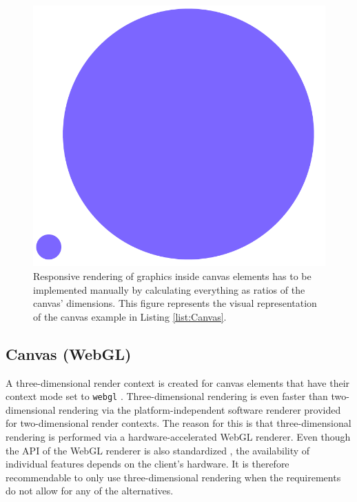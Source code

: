 \begin{figure}[tp]
\centering
\includegraphics[keepaspectratio,width=\linewidth,height=\fullh / 4]{images/canvas.png}
\caption[Canvas With Responsive Circles]{
  Responsive rendering of graphics inside canvas elements has to be implemented manually by calculating everything as ratios of the canvas' dimensions. 
  This figure represents the visual representation of the canvas example in Listing \ref{list:Canvas}. 
}
\label{fig:Canvas}
\end{figure}

\subsection{Canvas (WebGL)}
\label{sec:CanvasWebGL}

A three-dimensional render context is created for canvas elements that have their context mode set to \lstinline{webgl} .
Three-dimensional rendering is even faster than two-dimensional rendering via the platform-independent software renderer provided for two-dimensional render contexts.
The reason for this is that three-dimensional rendering is performed via a hardware-accelerated WebGL renderer.
Even though the API of the WebGL renderer is also standardized \parencite{WebGL}, the availability of individual features depends on the client's hardware.
It is therefore recommendable to only use three-dimensional rendering when the requirements do not allow for any of the alternatives.


